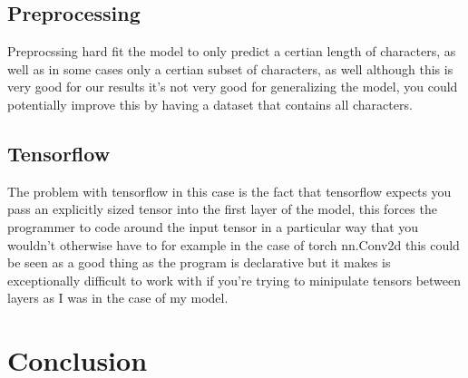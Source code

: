 \documentclass[11pt]{article}
\begin{document}
\subsection{Preprocessing}
Preprocssing hard fit the model to only predict a certian length of characters, as well as in some cases only a certian subset of characters, as well although this is very good for our results it's not very good for generalizing the model, you could potentially improve this by having a dataset that contains all characters.
\subsection{Tensorflow}
The problem with tensorflow in this case is the fact that tensorflow expects you pass an explicitly sized tensor into the first layer of the model, this forces the programmer to code around the input tensor in a particular way that you wouldn't otherwise have to for example in the case of torch nn.Conv2d this could be seen as a good thing as the program is declarative but it makes is exceptionally difficult to work with if you're trying to minipulate tensors between layers as I was in the case of my model.
\section{Conclusion}

{}

\end{document}
